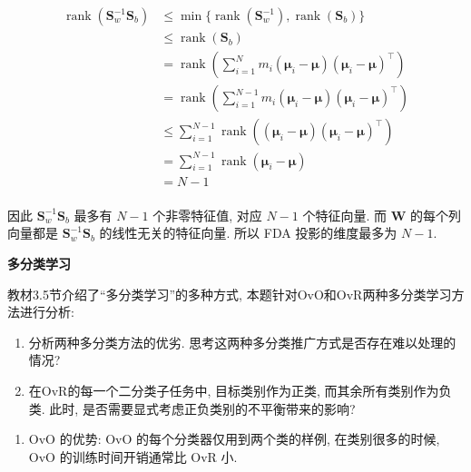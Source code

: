 \documentclass[answers]{exam}  %
\begin{document}
\begin{questions}
\begin{solution}
\begin{enumerate}
            $$
              \begin{aligned}
                \operatorname{rank}(\bm{S}_{w}^{-1}\bm{S}_{b})
                 & \le \min\{ \operatorname{rank}(\bm{S}_{w}^{-1}), \operatorname{rank}(\bm{S}_{b}) \}                \\
                 & \le \operatorname{rank}(\bm{S}_{b})                                                                \\
                 & = \operatorname{rank}(\sum_{i=1}^{N} m_{i}(\bm{\mu}_{i}-\bm{\mu})(\bm{\mu}_{i}-\bm{\mu})^{\top})   \\
                 & = \operatorname{rank}(\sum_{i=1}^{N-1} m_{i}(\bm{\mu}_{i}-\bm{\mu})(\bm{\mu}_{i}-\bm{\mu})^{\top}) \\
                 & \le \sum_{i=1}^{N-1} \operatorname{rank}((\bm{\mu}_{i}-\bm{\mu})(\bm{\mu}_{i}-\bm{\mu})^{\top})    \\
                 & = \sum_{i=1}^{N-1} \operatorname{rank}(\bm{\mu}_{i}-\bm{\mu})                                      \\
                 & = N-1                                                                                              \\
              \end{aligned}
            $$

            因此 $\bm{S}_{w}^{-1}\bm{S}_{b}$ 最多有 $N-1$ 个非零特征值, 对应 $N-1$ 个特征向量. 而 $\bm{W}$ 的每个列向量都是 $\bm{S}_{w}^{-1}\bm{S}_{b}$ 的线性无关的特征向量. 所以 FDA 投影的维度最多为 $N-1$.
    \end{enumerate}
  \end{solution}


  \question [20] \textbf{多分类学习}

  教材3.5节介绍了“多分类学习”的多种方式, 本题针对OvO和OvR两种多分类学习方法进行分析:
  \begin{enumerate}
    \item 分析两种多分类方法的优劣. 思考这两种多分类推广方式是否存在难以处理的情况?
    \item 在OvR的每一个二分类子任务中, 目标类别作为正类, 而其余所有类别作为负类. 此时, 是否需要显式考虑正负类别的不平衡带来的影响?
  \end{enumerate}
  \begin{solution}
    \begin{enumerate}
      \item

            OvO 的优势: OvO 的每个分类器仅用到两个类的样例, 在类别很多的时候, OvO 的训练时间开销通常比 OvR 小.


\end{enumerate}
\end{solution}
\end{questions}
\end{document}

